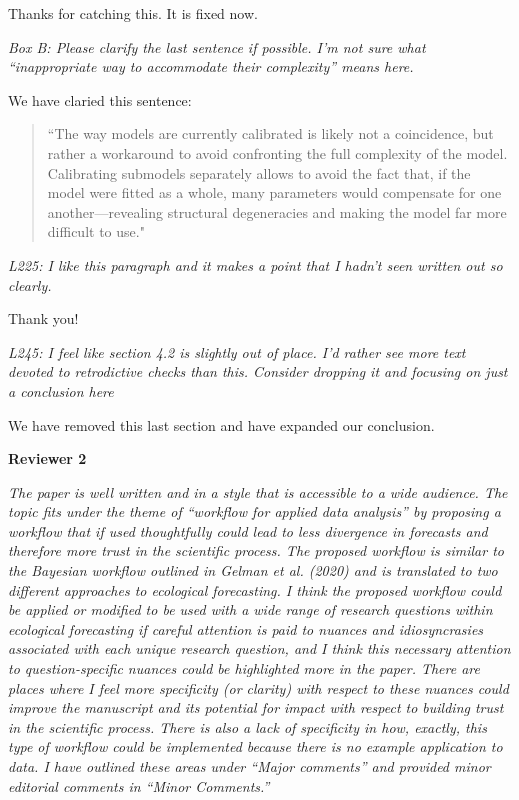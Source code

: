 \documentclass[11pt,letter]{article}
\begin{document}
Thanks for catching this. It is fixed now. 

\begin{mybox}
\emph{Box B: Please clarify the last sentence if possible. I’m not sure what “inappropriate way to accommodate their complexity” means here.}
\end{mybox}

We have claried this sentence:
\begin{quote}
``The way models are currently calibrated is likely not a coincidence, but rather a workaround to avoid confronting the full complexity of the model. Calibrating submodels separately allows to avoid the fact that, if the model were fitted as a whole, many parameters would compensate for one another---revealing structural degeneracies and making the model far more difficult to use."
\end{quote}

\begin{mybox}
\emph{L225: I like this paragraph and it makes a point that I hadn’t seen written out so clearly.}
\end{mybox}

Thank you!

\begin{mybox}
\emph{L245: I feel like section 4.2 is slightly out of place. I’d rather see more text devoted to retrodictive checks than this. Consider dropping it and focusing on just a conclusion here}
\end{mybox}

We have removed this last section and have expanded our conclusion.

{\bf Reviewer 2}

\begin{mybox}
\emph{The paper is well written and in a style that is accessible to a wide audience. The topic fits under the theme of “workflow for applied data analysis” by proposing a workflow that if used thoughtfully could lead to less divergence in forecasts and therefore more trust in the scientific process. The proposed workflow is similar to the Bayesian workflow outlined in Gelman et al. (2020) and is translated to two different approaches to ecological forecasting. I think the proposed workflow could be applied or modified to be used with a wide range of research questions within ecological forecasting if careful attention is paid to nuances and idiosyncrasies associated with each unique research question, and I think this necessary attention to question-specific nuances could be highlighted more in the paper. There are places where I feel more specificity (or clarity) with respect to these nuances could improve the manuscript and its potential for impact with respect to building trust in the scientific process. There is also a lack of specificity in how, exactly, this type of workflow could be implemented because there is no example application to data. I have outlined these areas under “Major comments” and provided minor editorial comments in “Minor Comments.”}
\end{mybox}
\end{document}
